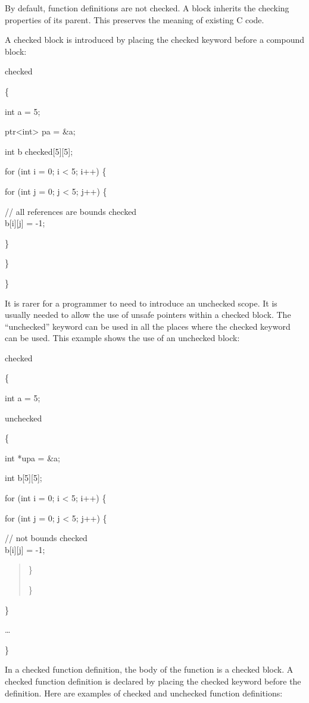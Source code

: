 \documentclass[]{article}
\begin{document}
By default, function definitions are not checked. A block inherits the
checking properties of its parent. This preserves the meaning of
existing C code.

A checked block is introduced by placing the checked keyword before a
compound block:

checked

\{

int a = 5;

ptr\textless{}int\textgreater{} pa = \&a;

int b checked{[}5{]}{[}5{]};

for (int i = 0; i \textless{} 5; i++) \{

for (int j = 0; j \textless{} 5; j++) \{

// all references are bounds checked\\
b{[}i{]}{[}j{]} = -1;

\}

\}

\}

It is rarer for a programmer to need to introduce an unchecked scope. It
is usually needed to allow the use of unsafe pointers within a checked
block. The ``unchecked'' keyword can be used in all the places where the
checked keyword can be used. This example shows the use of an unchecked
block:

checked

\{

int a = 5;

unchecked

\{

int *upa = \&a;

int b{[}5{]}{[}5{]};

for (int i = 0; i \textless{} 5; i++) \{

for (int j = 0; j \textless{} 5; j++) \{

// not bounds checked\\
b{[}i{]}{[}j{]} = -1;

\begin{quote}
\}

\}
\end{quote}

\}

\ldots{}

\}

In a checked function definition, the body of the function is a checked
block. A checked function definition is declared by placing the checked
keyword before the definition. Here are examples of checked and
unchecked function definitions:
\end{document}

